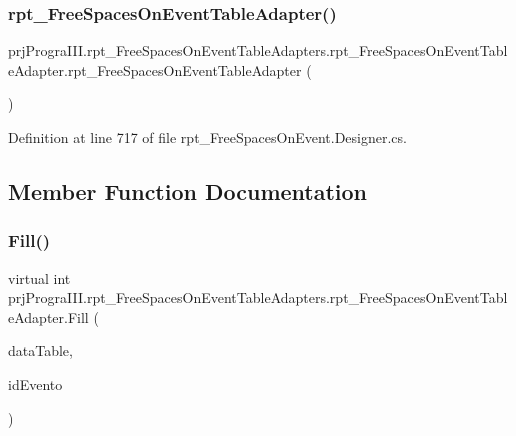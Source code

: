 \subsubsection{\texorpdfstring{rpt\+\_\+\+Free\+Spaces\+On\+Event\+Table\+Adapter()}{rpt\_FreeSpacesOnEventTableAdapter()}}
{\footnotesize\ttfamily prj\+Progra\+I\+I\+I.\+rpt\+\_\+\+Free\+Spaces\+On\+Event\+Table\+Adapters.\+rpt\+\_\+\+Free\+Spaces\+On\+Event\+Table\+Adapter.\+rpt\+\_\+\+Free\+Spaces\+On\+Event\+Table\+Adapter (\begin{DoxyParamCaption}{ }\end{DoxyParamCaption})}



Definition at line 717 of file rpt\+\_\+\+Free\+Spaces\+On\+Event.\+Designer.\+cs.



\subsection{Member Function Documentation}
\hypertarget{classprj_progra_i_i_i_1_1rpt___free_spaces_on_event_table_adapters_1_1rpt___free_spaces_on_event_table_adapter_a85a3f6077cbc8384ba689f8388099aae}{}\label{classprj_progra_i_i_i_1_1rpt___free_spaces_on_event_table_adapters_1_1rpt___free_spaces_on_event_table_adapter_a85a3f6077cbc8384ba689f8388099aae} 
\subsubsection{\texorpdfstring{Fill()}{Fill()}}
{\footnotesize\ttfamily virtual int prj\+Progra\+I\+I\+I.\+rpt\+\_\+\+Free\+Spaces\+On\+Event\+Table\+Adapters.\+rpt\+\_\+\+Free\+Spaces\+On\+Event\+Table\+Adapter.\+Fill (\begin{DoxyParamCaption}\item[{\hyperlink{classprj_progra_i_i_i_1_1rpt___free_spaces_on_event_1_1rpt___free_spaces_on_event_data_table}{rpt\+\_\+\+Free\+Spaces\+On\+Event.\+rpt\+\_\+\+Free\+Spaces\+On\+Event\+Data\+Table}}]{data\+Table,  }\item[{global\+::\+System.\+Nullable$<$ int $>$}]{id\+Evento }\end{DoxyParamCaption})\hspace{0.3cm}{\ttfamily [virtual]}}



